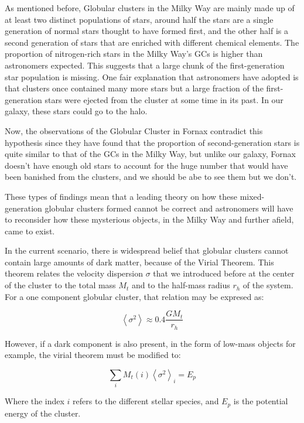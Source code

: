 As mentioned before, Globular clusters in the Milky Way are mainly made up of at least two distinct populations of stars, around half the stars are a single generation of normal stars thought to have formed first, and the other half is a second generation of stars that are enriched with different chemical elements. The proportion of nitrogen-rich stars in the Milky Way's GCs is higher than astronomers expected. This suggests that a large chunk of the first-generation star population is missing. One fair explanation that astronomers have adopted is that clusters once contained many more stars but a large fraction of the first-generation stars were ejected from the cluster at some time in its past. In our galaxy, these stars could go to the halo.

Now, the observations of the Globular Cluster in Fornax contradict this hypothesis since they have found that the proportion of second-generation stars is quite similar to that of the GCs in the Milky Way, but unlike our galaxy, Fornax doesn't have enough old stars to account for the huge number that would have been banished from the clusters, and we should be abe to see them but we don't.

These types of findings mean that a leading theory on how these mixed-generation globular clusters formed cannot be correct and astronomers will have to reconsider how these mysterious objects, in the Milky Way and further afield, came to exist.

In the current scenario, there is  widespread belief that globular clusters cannot contain large amounts of dark matter, because of the Virial Theorem. This theorem relates the velocity dispersion $ \sigma $ that we introduced before at the center of the cluster to the total mass $M_{t}$ and to the half-mass radius $r_{h}$ of the system. For a one component globular cluster, that relation may be expresed as:

\begin{equation}
\left\langle \sigma^{2}\right\rangle \approx0.4\frac{GM_{t}}{r_{h}}
\end{equation}

However, if a dark component is also present, in the form of low-mass objects for example, the virial theorem must be modified to:

\begin{equation}
\sum_{i}M_{t}(i)\left\langle \sigma^{2}\right\rangle _{i}=E_{p}
\end{equation}

Where the index $i$ refers to the different stellar species, and $E_{p}$ is the potential energy of the cluster.

